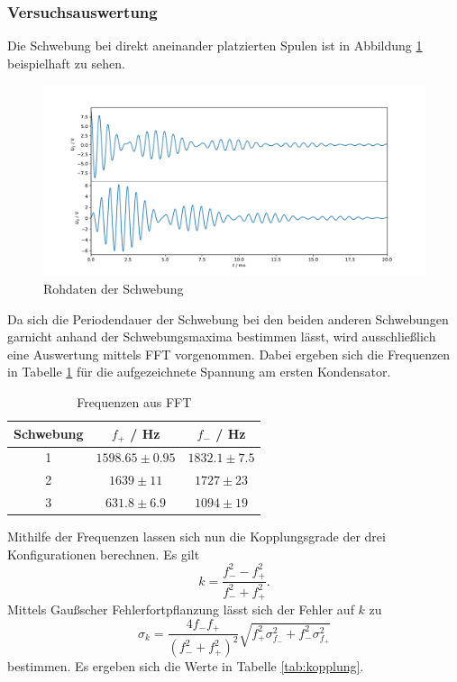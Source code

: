 \documentclass[a4paper, 12pt]{scrartcl}
\begin{document}
\subsubsection{Versuchsauswertung}

Die Schwebung bei direkt aneinander platzierten Spulen ist in Abbildung \ref{abb:schwebung_roh} beispielhaft zu sehen.

\begin{figure}[H]
\centering
\includegraphics[width=\textwidth]{plots/schwebung_roh.pdf}
\caption{Rohdaten der Schwebung}
\label{abb:schwebung_roh}
\end{figure}

Da sich die Periodendauer der Schwebung bei den beiden anderen Schwebungen garnicht anhand der Schwebungsmaxima bestimmen lässt, wird ausschließlich eine Auswertung mittels FFT vorgenommen. Dabei ergeben sich die Frequenzen in Tabelle \ref{tab:freq_schweb} für die aufgezeichnete Spannung am ersten Kondensator.

\begin{table}[H]
\centering
\begin{tabular}{c|c|c}
Schwebung & $f_+$ / Hz & $f_-$ / Hz \\
\hline
1 & $1598.65 \pm 0.95$ & $1832.1 \pm 7.5$ \\
2 & $1639 \pm 11$ & $1727 \pm 23$ \\
3 & $631.8 \pm 6.9$ & $1094 \pm 19$
\end{tabular}
\caption{Frequenzen aus FFT}
\label{tab:freq_schweb}
\end{table}

Mithilfe der Frequenzen lassen sich nun die Kopplungsgrade der drei Konfigurationen berechnen. Es gilt
$$k = \frac{f_-^2 - f_+^2}{f_-^2 + f_+^2}.$$
Mittels Gaußscher Fehlerfortpflanzung lässt sich der Fehler auf $k$ zu
$$\sigma_k = \frac{4f_-f_+}{(f_-^2+f_+^2)^2} \sqrt{f_+^2 \sigma_{f_-}^2 + f_-^2 \sigma_{f_+}^2}$$
bestimmen. Es ergeben sich die Werte in Tabelle \ref{tab:kopplung}.
\end{document}
